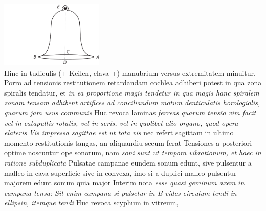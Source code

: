 \pend
\newpage
\pstart
%
\centering \includegraphics[trim = 0mm 0mm 0mm 0mm, clip, width=0.37\textwidth]{images/LH035,14,02_156r-d.pdf}\\
\noindent {}
\pend
\vspace{1em}
\count{}
\count{}
\pstart
Hinc in tudiculis (+ Keilen, clava +) manubrium versus extremitatem minuitur. Porro ad tensionis 
restitutionem\protect{} retardandam cochlea\protect{} adhiberi potest in qua zona spiralis tendatur, et \textit{in ea proportione magis tendetur in qua magis  hanc spiralem zonam tensam adhibent artifices ad conciliandum motum denticulatis horologiolis, quarum jam usus communis } Huc revoca laminas\protect{}
\textit{ferreas quarum tensio vim facit vel in catapultis rotatis\protect{}, vel in seris, vel in quolibet alio organo, quod opera elateris }
\textit{Vis impressa sagittae\protect{} est ut tota vis } nec refert sagittam in ultimo momento restitutionis tangas, an aliquandiu secum ferat Tensiones a posteriori optime noscuntur ope sonorum, nam
\textit{soni sunt ut tempora vibrationum\protect{}, et haec in ratione subduplicata } Pulsatae campanae\protect{} eundem sonum edunt, sive pulsentur a malleo in cava superficie sive in convexa, imo si a duplici malleo pulsentur  majorem edunt sonum quia major  Interim nota \textit{esse quasi geminum axem in campana tensa\protect{}: 
Sit enim campana 
si pulsetur in B vides circulum  tendi in ellipsin, itemque  tendi } Huc revoca scyphum\protect{} in vitreum,
